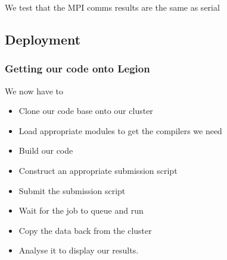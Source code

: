 We test that the MPI comms results are the same as serial

\begin{Shaded}
\begin{Highlighting}[]

    \NormalTok{(}  
      \NormalTok{(}  
         
                \NormalTok{< }\NormalTok{);}
      \NormalTok{\}}
    \NormalTok{\}}
  \NormalTok{\}}
\end{Highlighting}
\end{Shaded}

\subsection{Deployment}\label{deployment}

\subsubsection{Getting our code onto
Legion}\label{getting-our-code-onto-legion}

We now have to

\begin{itemize}
\itemsep1pt\parskip0pt
\item
  Clone our code base onto our cluster
\item
  Load appropriate modules to get the compilers we need
\item
  Build our code
\item
  Construct an appropriate submission script
\item
  Submit the submission script
\item
  Wait for the job to queue and run
\item
  Copy the data back from the cluster
\item
  Analyse it to display our results.
\end{itemize}

